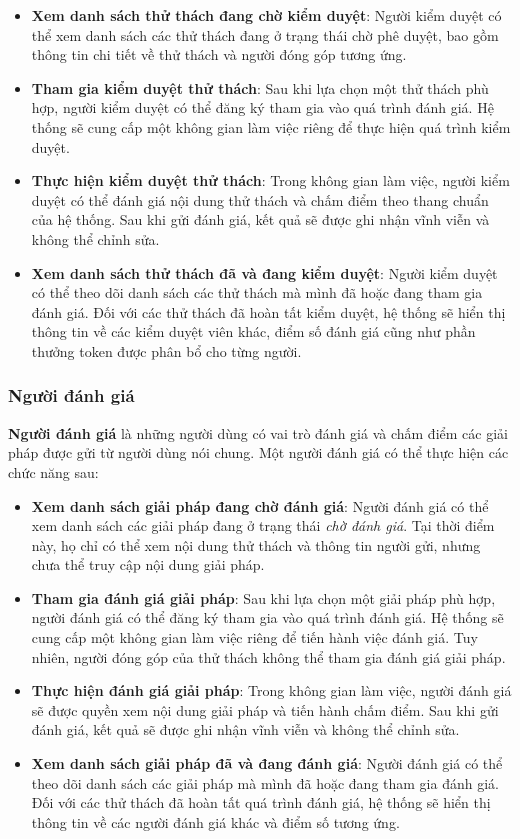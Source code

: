 \begin{itemize}
  \item \textbf{Xem danh sách thử thách đang chờ kiểm duyệt}: Người kiểm duyệt có thể xem danh sách các thử thách đang ở trạng thái chờ phê duyệt, bao gồm thông tin chi tiết về thử thách và người đóng góp tương ứng.
  \item \textbf{Tham gia kiểm duyệt thử thách}: Sau khi lựa chọn một thử thách phù hợp, người kiểm duyệt có thể đăng ký tham gia vào quá trình đánh giá. Hệ thống sẽ cung cấp một không gian làm việc riêng để thực hiện quá trình kiểm duyệt.
  \item \textbf{Thực hiện kiểm duyệt thử thách}: Trong không gian làm việc, người kiểm duyệt có thể đánh giá nội dung thử thách và chấm điểm theo thang chuẩn của hệ thống. Sau khi gửi đánh giá, kết quả sẽ được ghi nhận vĩnh viễn và không thể chỉnh sửa.
  \item \textbf{Xem danh sách thử thách đã và đang kiểm duyệt}: Người kiểm duyệt có thể theo dõi danh sách các thử thách mà mình đã hoặc đang tham gia đánh giá.
        Đối với các thử thách đã hoàn tất kiểm duyệt, hệ thống sẽ hiển thị thông tin về các kiểm duyệt viên khác, điểm số đánh giá cũng như phần thưởng token được phân bổ cho từng người.
\end{itemize}

\subsubsection{Người đánh giá}

\textbf{Người đánh giá} là những người dùng có vai trò đánh giá và chấm điểm các giải pháp được gửi từ người dùng nói chung. Một người đánh giá có thể thực hiện các chức năng sau:

\begin{itemize}
  \item \textbf{Xem danh sách giải pháp đang chờ đánh giá}: Người đánh giá có thể xem danh sách các giải pháp đang ở trạng thái \textit{chờ đánh giá}. Tại thời điểm này, họ chỉ có thể xem nội dung thử thách và thông tin người gửi, nhưng chưa thể truy cập nội dung giải pháp.
  \item \textbf{Tham gia đánh giá giải pháp}: Sau khi lựa chọn một giải pháp phù hợp, người đánh giá có thể đăng ký tham gia vào quá trình đánh giá.
        Hệ thống sẽ cung cấp một không gian làm việc riêng để tiến hành việc đánh giá. Tuy nhiên, người đóng góp của thử thách không thể tham gia đánh giá giải pháp.
  \item \textbf{Thực hiện đánh giá giải pháp}: Trong không gian làm việc, người đánh giá sẽ được quyền xem nội dung giải pháp và tiến hành chấm điểm. Sau khi gửi đánh giá, kết quả sẽ được ghi nhận vĩnh viễn và không thể chỉnh sửa.
  \item \textbf{Xem danh sách giải pháp đã và đang đánh giá}: Người đánh giá có thể theo dõi danh sách các giải pháp mà mình đã hoặc đang tham gia đánh giá.
        Đối với các thử thách đã hoàn tất quá trình đánh giá, hệ thống sẽ hiển thị thông tin về các người đánh giá khác và điểm số tương ứng.
\end{itemize}

